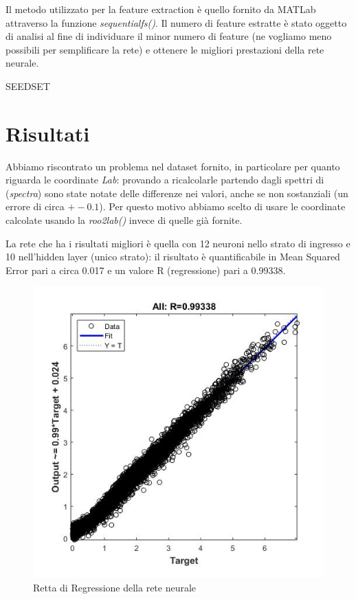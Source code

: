 Il metodo utilizzato per la feature extraction è quello fornito da MATLab attraverso la funzione \textit{sequentialfs()}. Il numero di feature estratte è stato oggetto di analisi al fine di individuare il minor numero di feature (ne vogliamo meno possibili per semplificare la rete) e ottenere le migliori prestazioni della rete neurale.

SEEDSET

\section{Risultati}
Abbiamo riscontrato un problema nel dataset fornito, in particolare per quanto riguarda le coordinate \textit{Lab}: provando a ricalcolarle partendo dagli spettri di (\textit{spectra}) sono state notate delle differenze nei valori, anche se non sostanziali (un errore di circa \(+- 0.1\)). Per questo motivo abbiamo scelto di usare le coordinate calcolate usando la \textit{roo2lab()} invece di quelle già fornite.

La rete che ha i risultati migliori è quella con 12 neuroni nello strato di ingresso e 10 nell'hidden layer (unico strato): il risultato è quantificabile in Mean Squared Error pari a circa 0.017 e un valore R (regressione) pari a 0.99338.

\begin{figure}
\begin{center}
	\includegraphics[scale=0.7]{images/rete1-regression.jpg}
\end{center}
\caption{Retta di Regressione della rete neurale}
\end{figure}

